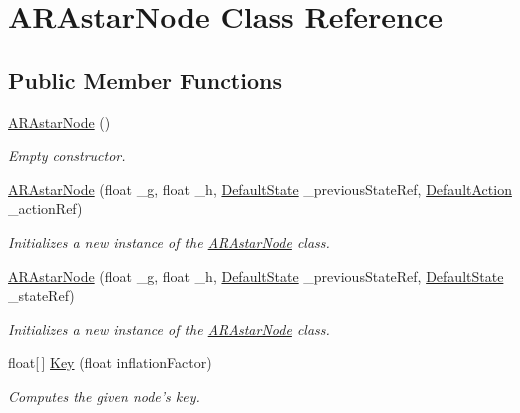 \hypertarget{class_a_r_astar_node}{\section{A\-R\-Astar\-Node Class Reference}
\label{class_a_r_astar_node}
}
\subsection*{Public Member Functions}
\begin{DoxyCompactItemize}
\item 
\hypertarget{class_a_r_astar_node_a9ab926f281a411131bce6855c7dffb8d}{\hyperlink{class_a_r_astar_node_a9ab926f281a411131bce6855c7dffb8d}{A\-R\-Astar\-Node} ()}\label{class_a_r_astar_node_a9ab926f281a411131bce6855c7dffb8d}

\begin{DoxyCompactList}\small\item\em Empty constructor. \end{DoxyCompactList}\item 
\hyperlink{class_a_r_astar_node_a248e2bfe43c8587087c91a9058cf1800}{A\-R\-Astar\-Node} (float \-\_\-g, float \-\_\-h, \hyperlink{class_default_state}{Default\-State} \-\_\-previous\-State\-Ref, \hyperlink{class_default_action}{Default\-Action} \-\_\-action\-Ref)
\begin{DoxyCompactList}\small\item\em Initializes a new instance of the \hyperlink{class_a_r_astar_node}{A\-R\-Astar\-Node} class. \end{DoxyCompactList}\item 
\hyperlink{class_a_r_astar_node_a99cdbb993be9eecbdd75614ce34f3131}{A\-R\-Astar\-Node} (float \-\_\-g, float \-\_\-h, \hyperlink{class_default_state}{Default\-State} \-\_\-previous\-State\-Ref, \hyperlink{class_default_state}{Default\-State} \-\_\-state\-Ref)
\begin{DoxyCompactList}\small\item\em Initializes a new instance of the \hyperlink{class_a_r_astar_node}{A\-R\-Astar\-Node} class. \end{DoxyCompactList}\item 
float\mbox{[}$\,$\mbox{]} \hyperlink{class_a_r_astar_node_ad270a3400cf18c3e937e9dd7e5d59c19}{Key} (float inflation\-Factor)
\begin{DoxyCompactList}\small\item\em Computes the given node's key. \end{DoxyCompactList}\end{DoxyCompactItemize}
